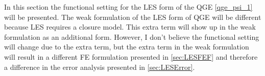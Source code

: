 In this section the functional setting for the LES form of the QGE \eqref{qge_psi_1} will be
presented. The weak formulation of the LES form of QGE will be different because LES requires a
closure model. This extra term will show up in the weak formulation as an additional form. However,
I don't believe the functional setting will change due to the extra term, but the extra term in the
weak formulation will result in a different FE formulation presented in \autoref{sec:LESFEF} and
therefore a difference in the error analysis presented in \autoref{sec:LESError}.
